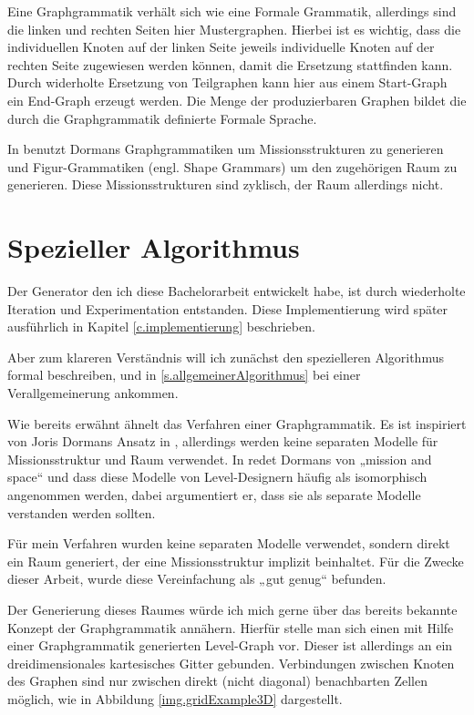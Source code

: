 Eine Graphgrammatik verhält sich wie eine Formale Grammatik, allerdings sind die linken und rechten Seiten hier Mustergraphen. Hierbei ist es wichtig, dass die individuellen Knoten auf der linken Seite jeweils individuelle Knoten auf der rechten Seite zugewiesen werden können, damit die Ersetzung stattfinden kann. 
\cite[Kap.~5.5.1, S.~80]{shaker2016procedural}
Durch widerholte Ersetzung von Teilgraphen kann hier aus einem Start-Graph ein End-Graph erzeugt werden. Die Menge der produzierbaren Graphen bildet die durch die Graphgrammatik definierte Formale Sprache. 

In \cite{dormansAdventures} benutzt Dormans Graphgrammatiken um Missionsstrukturen zu generieren und Figur-Grammatiken (engl. Shape Grammars) um den zugehörigen Raum zu generieren. Diese Missionsstrukturen sind zyklisch, der Raum allerdings nicht.

\section{Spezieller Algorithmus}

Der Generator den ich diese Bachelorarbeit entwickelt habe, ist durch wiederholte Iteration und Experimentation entstanden. Diese Implementierung wird später ausführlich in Kapitel \ref{c.implementierung} beschrieben.

Aber zum klareren Verständnis will ich zunächst den spezielleren Algorithmus formal beschreiben, und in 
\ref{s.allgemeinerAlgorithmus} bei einer Verallgemeinerung ankommen. 

Wie bereits erwähnt ähnelt das Verfahren einer Graphgrammatik. Es ist inspiriert von Joris Dormans Ansatz in 
\cite{dormansAdventures},
allerdings werden keine separaten Modelle für Missionsstruktur und Raum verwendet.
In \cite[2.]{dormansModelTransformation} redet Dormans von „mission and space“ und dass diese Modelle von Level-Designern häufig als isomorphisch angenommen werden, dabei argumentiert er, dass sie als separate Modelle verstanden werden sollten.

Für mein Verfahren wurden keine separaten Modelle verwendet, sondern direkt ein Raum generiert, der eine Missionsstruktur implizit  beinhaltet. Für die Zwecke dieser Arbeit, wurde diese Vereinfachung als „gut genug“ befunden.

Der Generierung dieses Raumes würde ich mich gerne über das bereits bekannte Konzept der Graphgrammatik annähern. Hierfür stelle man sich einen mit Hilfe einer Graphgrammatik generierten Level-Graph vor. Dieser ist allerdings an ein dreidimensionales kartesisches Gitter gebunden. Verbindungen zwischen Knoten des Graphen sind nur zwischen direkt (nicht diagonal) benachbarten Zellen möglich, wie in Abbildung \ref{img.gridExample3D} dargestellt.


